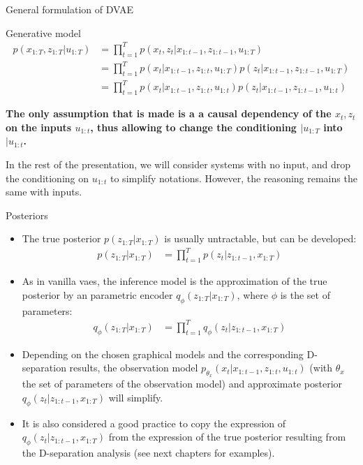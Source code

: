 \begin{frame}{General formulation of DVAE}
    \begin{block}{Generative model}
        \begin{align*}
            p(x_{1:T}, z_{1:T} \vert u_{1:T}) &= \prod_{t=1}^T p(x_t, z_t \vert x_{1:t-1}, z_{1:t-1}, u_{1:T}) \\
            &= \prod_{t=1}^T p(x_t \vert x_{1:t-1}, z_{1:t}, u_{1:T}) p(z_t \vert x_{1:t-1}, z_{1:t-1}, u_{1:T}) \\
            &= \prod_{t=1}^T p(x_t \vert x_{1:t-1}, z_{1:t}, u_{1:t}) p(z_t \vert x_{1:t-1}, z_{1:t-1}, u_{1:t})
        \end{align*}
    \end{block}
    \textbf{The only assumption that is made is a a causal dependency of the $x_t, z_t$ on the inputs $u_{1:t}$, thus allowing to change the conditioning $\vert u_{1:T}$ into $\vert u_{1:t}$.}

    In the rest of the presentation, we will consider systems with no input, and drop the conditioning on $u_{1:t}$ to simplify notations. However, the reasoning remains the same with inputs.
\end{frame}

\begin{frame}{Posteriors}
    \begin{itemize}
        \item <1-> The true posterior  $p(z_{1:T} \vert x_{1:T})$ is usually untractable, but can be developed:
            \begin{align*}
                p(z_{1:T} \vert x_{1:T}) &= \prod_{t=1}^T p(z_t \vert z_{1:t-1}, x_{1:T})
            \end{align*}
        \item <2-> As in vanilla \glspl{vae}, the inference model is the approximation of the true posterior by an parametric encoder $q_{\phi}(z_{1:T} \vert x_{1:T})$, where $\phi$ is the set of parameters:
            \begin{align*}
                q_{\phi}(z_{1:T} \vert x_{1:T}) &= \prod_{t=1}^T q_\phi(z_t \vert z_{1:t-1}, x_{1:T})
            \end{align*}
        \item <3-> Depending on the chosen graphical models and the corresponding D-separation results, the observation model $p_{\theta_x}(x_t \vert x_{1:t-1}, z_{1:t}, u_{1:t})$ (with $\theta_x$ the set of parameters of the observation model) and approximate posterior $q_\phi(z_t \vert z_{1:t-1}, x_{1:T})$ will simplify. 
        \item <4-> It is also considered a good practice to copy the expression of $q_\phi(z_t \vert z_{1:t-1}, x_{1:T})$ from the expression of the true posterior resulting from the D-separation analysis (see next chapters for examples).
    \end{itemize}
\end{frame}

